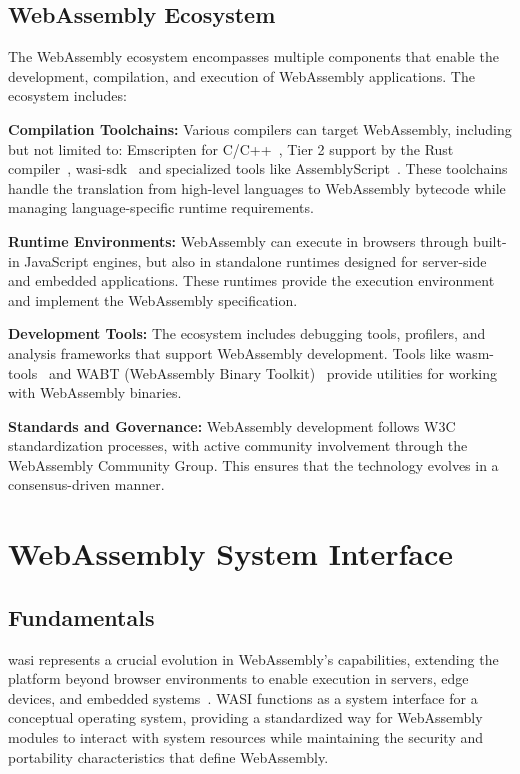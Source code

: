 \subsection{WebAssembly Ecosystem}
\label{subsec:wasm-ecosystem}

The WebAssembly ecosystem encompasses multiple components that enable the development, compilation, and execution of WebAssembly applications. The ecosystem includes:

\textbf{Compilation Toolchains:} Various compilers can target WebAssembly, including but not limited to: Emscripten for C/C++~\cite{emscripten_git}, Tier 2 support by the Rust compiler~\cite{rust_wasm_target}, wasi-sdk~\cite{wasisdk} and specialized tools like AssemblyScript~\cite{assemblyscript_git}. These toolchains handle the translation from high-level languages to WebAssembly bytecode while managing language-specific runtime requirements.

\textbf{Runtime Environments:} WebAssembly can execute in browsers through built-in JavaScript engines, but also in standalone runtimes designed for server-side and embedded applications. These runtimes provide the execution environment and implement the WebAssembly specification.

\textbf{Development Tools:} The ecosystem includes debugging tools, profilers, and analysis frameworks that support WebAssembly development. Tools like wasm-tools~\cite{wasm_tools_git} and WABT (WebAssembly Binary Toolkit)~\cite{wabt_git} provide utilities for working with WebAssembly binaries.

\textbf{Standards and Governance:} WebAssembly development follows W3C standardization processes, with active community involvement through the WebAssembly Community Group. This ensures that the technology evolves in a consensus-driven manner.

\section{WebAssembly System Interface}
\label{sec:wasi}

\subsection{Fundamentals}
\label{subsec:wasi-fundamentals}

\acrfull{wasi} represents a crucial evolution in WebAssembly's capabilities, extending the platform beyond browser environments to enable execution in servers, edge devices, and embedded systems~\cite{wasi_mozilla_blog}. WASI functions as a system interface for a conceptual operating system, providing a standardized way for WebAssembly modules to interact with system resources while maintaining the security and portability characteristics that define WebAssembly.

